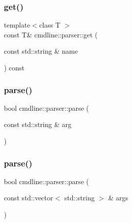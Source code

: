 \subsubsection{\texorpdfstring{get()}{get()}}
{\footnotesize\ttfamily template$<$class T $>$ \\
const T\& cmdline\+::parser\+::get (\begin{DoxyParamCaption}\item[{const std\+::string \&}]{name }\end{DoxyParamCaption}) const\hspace{0.3cm}{\ttfamily [inline]}}

\mbox{\label{classcmdline_1_1parser_ab8ca75cca3abf36b9474edcf0ce21ca6}} 
\subsubsection{\texorpdfstring{parse()}{parse()}\hspace{0.1cm}{\footnotesize\ttfamily [1/3]}}
{\footnotesize\ttfamily bool cmdline\+::parser\+::parse (\begin{DoxyParamCaption}\item[{const std\+::string \&}]{arg }\end{DoxyParamCaption})\hspace{0.3cm}{\ttfamily [inline]}}

\mbox{\label{classcmdline_1_1parser_a745c9519abe50562987487b6bf794fd7}} 
\subsubsection{\texorpdfstring{parse()}{parse()}\hspace{0.1cm}{\footnotesize\ttfamily [2/3]}}
{\footnotesize\ttfamily bool cmdline\+::parser\+::parse (\begin{DoxyParamCaption}\item[{const std\+::vector$<$ std\+::string $>$ \&}]{args }\end{DoxyParamCaption})\hspace{0.3cm}{\ttfamily [inline]}}

\mbox{\label{classcmdline_1_1parser_a83175f24d7d9e29256b855fb249f427b}} 
